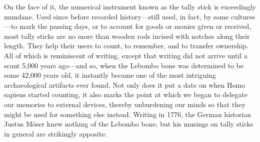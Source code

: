 On the face of it, the numerical instrument known as the tally stick is exceedingly mundane. Used since before recorded history—still used, in fact, by some cultures—to mark the passing days, or to account for goods or monies given or received, most tally sticks are no more than wooden rods incised with notches along their length. They help their users to count, to remember, and to transfer ownership. All of which is reminiscent of writing, except that writing did not arrive until a scant 5,000 years ago—and so, when the Lebombo bone was determined to be some 42,000 years old, it instantly became one of the most intriguing archaeological artifacts ever found. Not only does it put a date on when Homo sapiens started counting, it also marks the point at which we began to delegate our memories to external devices, thereby unburdening our minds so that they might be used for something else instead. Writing in 1776, the German historian Justus Möser knew nothing of the Lebombo bone, but his musings on tally sticks in general are strikingly apposite:

